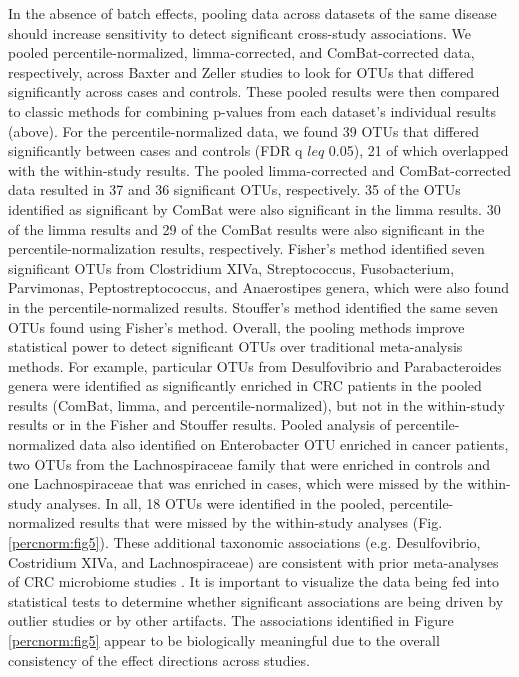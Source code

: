 In the absence of batch effects, pooling data across datasets of the same disease should increase sensitivity to detect significant cross-study associations.
We pooled percentile-normalized, limma-corrected, and ComBat-corrected data, respectively, across Baxter and Zeller studies to look for OTUs that differed significantly across cases and controls.
These pooled results were then compared to classic methods for combining p-values from each dataset's individual results (above).
For the percentile-normalized data, we found 39 OTUs that differed significantly between cases and controls (FDR q $leq$ 0.05), 21 of which overlapped with the within-study results.
The pooled limma-corrected and ComBat-corrected data resulted in 37 and 36 significant OTUs, respectively.
35 of the OTUs identified as significant by ComBat were also significant in the limma results.
30 of the limma results and 29 of the ComBat results were also significant in the percentile-normalization results, respectively.
Fisher's method identified seven significant OTUs from Clostridium XIVa, Streptococcus, Fusobacterium, Parvimonas, Peptostreptococcus, and Anaerostipes genera, which were also found in the percentile-normalized results.
Stouffer's method identified the same seven OTUs found using Fisher's method.
Overall, the pooling methods improve statistical power to detect significant OTUs over traditional meta-analysis methods.
For example, particular OTUs from Desulfovibrio and Parabacteroides genera were identified as significantly enriched in CRC patients in the pooled results (ComBat, limma, and percentile-normalized), but not in the within-study results or in the Fisher and Stouffer results.
Pooled analysis of percentile-normalized data also identified on Enterobacter OTU enriched in cancer patients, two OTUs from the Lachnospiraceae family that were enriched in controls and one Lachnospiraceae that was enriched in cases, which were missed by the within-study analyses.
In all, 18 OTUs were identified in the pooled, percentile-normalized results that were missed by the within-study analyses (Fig. \ref{percnorm:fig5}).
These additional taxonomic associations (e.g. Desulfovibrio, Costridium XIVa, and Lachnospiraceae) are consistent with prior meta-analyses of CRC microbiome studies \cite{17,43}.
It is important to visualize the data being fed into statistical tests to determine whether significant associations are being driven by outlier studies or by other artifacts.
The associations identified in Figure \ref{percnorm:fig5} appear to be biologically meaningful due to the overall consistency of the effect directions across studies.

